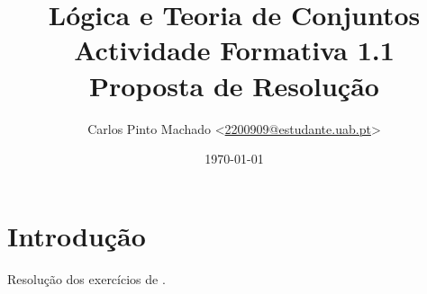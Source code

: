 \documentclass[11pt, a4paper]{article}
\title{
	Lógica e Teoria de Conjuntos\\
	Actividade Formativa 1.1\\
	Proposta de Resolução
}
\author{
	Carlos Pinto Machado
	<\href{mailto:2200909@estudante.uab.pt}{2200909@estudante.uab.pt}>
}
\date{\today}
\begin{document}
\maketitle

\section*{Introdução}

\paragraph{} Resolução dos exercícios de \cite[secção 1.1 Linguagem]{Edmundo2021}.


\clearpage

\printbibliography[title={Bibliografia},heading=bibintoc]
\end{document}
